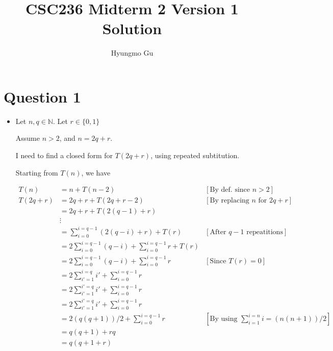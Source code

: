 \documentclass[12pt]{article}
\begin{document}
\title{CSC236 Midterm 2 Version 1 Solution}
\author{Hyungmo Gu}
\maketitle

\section*{Question 1}
\begin{itemize}
    \item

    Let $n, q \in \mathbb{N}$. Let $r \in \{0,1\}$

    \bigskip

    Assume $n > 2$, and $n = 2q + r$.

    \bigskip

    I need to find a closed form for $T(2q + r)$, using repeated subtitution.

    \bigskip

    Starting from $T(n)$, we have

    \begin{align}
        T(n) &= n + T(n-2) & [\text{By def. since $n > 2$}]\\
        T(2q+r) &= 2q+r + T(2q+r-2) & [\text{By replacing $n$ for $2q + r$}]\\
        &= 2q+r + T(2(q-1)+r)\\
        &\vdots\\
        &= \sum\limits_{i=0}^{i=q-1} (2(q-i) + r) + T(r) & [\text{After $q-1$ repeatitions}]\\
        &= 2\sum\limits_{i=0}^{i=q-1} (q-i) + \sum\limits_{i=0}^{i=q-1} r + T(r)\\
        &= 2\sum\limits_{i=0}^{i=q-1} (q-i) + \sum\limits_{i=0}^{i=q-1} r & [\text{Since $T(r) = 0$}]\\
        &= 2\sum\limits_{i'=1}^{i=q} i' + \sum\limits_{i=0}^{i=q-1} r\\
        &= 2\sum\limits_{i'=1}^{i'=q} i' + \sum\limits_{i=0}^{i=q-1} r\\
        &= 2\sum\limits_{i'=1}^{i'=q} i' + \sum\limits_{i=0}^{i=q-1} r\\
        &= 2(q(q+1))/2 + \sum\limits_{i=0}^{i=q-1} r &[\text{By using $\sum\limits_{i=1}^{i=n} i =(n(n+1))/2$}]\\
        &= q(q+1) + rq\\
        &= q(q+1+r)
    \end{align}


\end{itemize}
\end{document}
